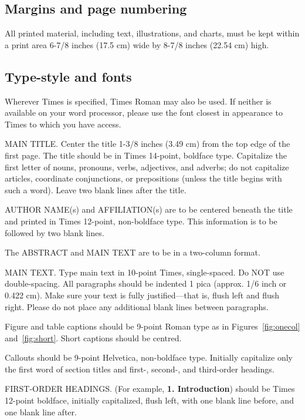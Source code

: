 \documentclass[10pt,twocolumn,letterpaper]{article}
\begin{document}
\subsection{Margins and page numbering}

All printed material, including text, illustrations, and charts, must be kept
within a print area 6-7/8 inches (17.5 cm) wide by 8-7/8 inches (22.54 cm)
high.



\subsection{Type-style and fonts}

Wherever Times is specified, Times Roman may also be used. If neither is
available on your word processor, please use the font closest in
appearance to Times to which you have access.

MAIN TITLE. Center the title 1-3/8 inches (3.49 cm) from the top edge of
the first page. The title should be in Times 14-point, boldface type.
Capitalize the first letter of nouns, pronouns, verbs, adjectives, and
adverbs; do not capitalize articles, coordinate conjunctions, or
prepositions (unless the title begins with such a word). Leave two blank
lines after the title.

AUTHOR NAME(s) and AFFILIATION(s) are to be centered beneath the title
and printed in Times 12-point, non-boldface type. This information is to
be followed by two blank lines.

The ABSTRACT and MAIN TEXT are to be in a two-column format.

MAIN TEXT. Type main text in 10-point Times, single-spaced. Do NOT use
double-spacing. All paragraphs should be indented 1 pica (approx. 1/6
inch or 0.422 cm). Make sure your text is fully justified---that is,
flush left and flush right. Please do not place any additional blank
lines between paragraphs.

Figure and table captions should be 9-point Roman type as in
Figures~\ref{fig:onecol} and~\ref{fig:short}.  Short captions should be centred.

\noindent Callouts should be 9-point Helvetica, non-boldface type.
Initially capitalize only the first word of section titles and first-,
second-, and third-order headings.

FIRST-ORDER HEADINGS. (For example, {\large \bf 1. Introduction})
should be Times 12-point boldface, initially capitalized, flush left,
with one blank line before, and one blank line after.
\end{document}
